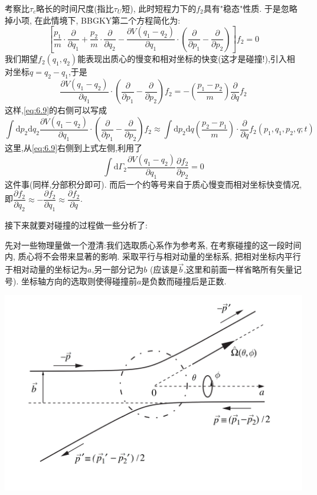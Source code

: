     考察比$\tau_{c}$略长的时间尺度(指比$\tau_{U}$短), 此时短程力下的$f_2$具有"稳态"性质. 于是忽略掉小项, 在此情境下, BBGKY第二个方程简化为:
    \begin{equation}
      \left[ \frac{p_1}{m} \cdot \dfrac{\partial }{\partial q_1} + \frac{p_2}{m} \cdot \dfrac{\partial }{\partial q_2}- \dfrac{\partial V(q_1-q_2)}{\partial q_1}\cdot \left( \dfrac{\partial }{\partial p_1}-\dfrac{\partial }{\partial p_2} \right)  \right] f_2=0
    \end{equation}
    我们期望$f_2(q_1,q_2)$能表现出质心的慢变和相对坐标的快变(这才是碰撞!),引入相对坐标$q=q_2-q_1$,于是 
    \begin{equation}
      \dfrac{\partial V(q_1-q_2)}{\partial q_1}\cdot \left( \dfrac{\partial }{\partial p_1}-\dfrac{\partial }{\partial p_2} \right) f_2=-\left(\frac{p_1-p_2}{m}\right)\dfrac{\partial }{\partial q}f_2
    \end{equation}
    这样,\eqref{eq:6.9}的右侧可以写成
    \begin{equation}
      \int \mathrm{d} p_2 \mathrm{d} q_2 \dfrac{\partial V(q_1-q_2)}{\partial q_1} \cdot \left( \dfrac{\partial }{\partial p_1}-\dfrac{\partial }{\partial p_2} \right) f_2 \approx \int \mathrm{d} p_2 \mathrm{d} q \left( \frac{p_2-p_1}{m} \right) \cdot \dfrac{\partial }{\partial q}f_2(p_1,q_1,p_2,q;t)
    \end{equation}
    这里,从\eqref{eq:6.9}右侧到上式左侧,利用了
    \[\int \mathrm{d} \Gamma_2 \dfrac{\partial V(q_1-q_2)}{\partial q_1} \dfrac{\partial f_2}{\partial p_2}=0\]
    这件事(同样,分部积分即可). 而后一个约等号来自于质心慢变而相对坐标快变情况, 即$\dfrac{\partial f_2}{\partial q_2} \approx -\dfrac{\partial f_2}{\partial q_1} \approx \dfrac{\partial f_2}{\partial q}$.
    
    \vspace*{0.5cm}
        
    接下来就要对碰撞的过程做一些分析了:
    
    先对一些物理量做一个澄清:我们选取质心系作为参考系, 在考察碰撞的这一段时间内, 质心将不会带来显著的影响. 采取平行与相对动量的坐标系, 把相对坐标内平行于相对动量的坐标记为$a$,另一部分记为$b$ (应该是$\vec{b}$,这里和前面一样省略所有矢量记号). 坐标轴方向的选取则使得碰撞前$a$是负数而碰撞后是正数.
    \begin{center}
      \includegraphics*[width=0.55\linewidth]{./picture/Boltzmann.png}
    \end{center}
    

